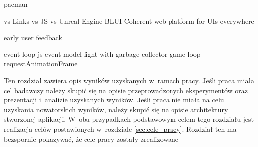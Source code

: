 pacman

vs Links
vs JS
vs Unreal Engine
    BLUI
    Coherent
        web platform for UIs everywhere

early user feedback

event loop
js event model
fight with garbage collector
game loop
requestAnimationFrame

Ten rozdział zawiera opis wyników uzyskanych w~ramach pracy. Jeśli praca miała
cel badawczy należy skupić się na opisie przeprowadzonych eksperymentów oraz
prezentacji i~analizie uzyskanych wyników. Jeśli praca nie miała na celu
uzyskania nowatorskich wyników, należy skupić się na opisie architektury
stworzonej aplikacji. W~obu przypadkach podstawowym celem tego rozdziału jest
realizacja celów postawionych w~rozdziale \ref{sec:cele_pracy}. Rozdział ten ma
bezspornie pokazywać, że cele pracy zostały zrealizowane
